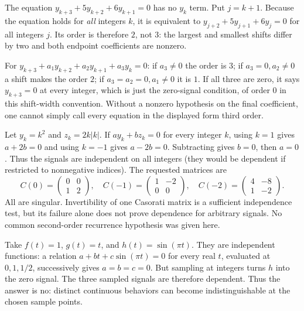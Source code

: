 The equation $y_{k+3}+5y_{k+2}+6y_{k+1}=0$ has no $y_k$ term.
Put $j=k+1$. Because the equation holds for \emph{all} integers $k$, it
is equivalent to $y_{j+2}+5y_{j+1}+6y_j=0$ for all integers $j$.
Its order is therefore $2$, not $3$: the largest and smallest shifts differ
by two and both endpoint coefficients are nonzero.

For $y_{k+3}+a_1y_{k+2}+a_2y_{k+1}+a_3y_k=0$:
if $a_3\ne0$ the order is $3$; if $a_3=0,a_2\ne0$ a shift makes the
order $2$; if $a_3=a_2=0,a_1\ne0$ it is $1$.
If all three are zero, it says $y_{k+3}=0$ at every integer, which is
just the zero-signal condition, of order $0$ in this shift-width convention.
Without a nonzero hypothesis on the final coefficient, one cannot simply
call every equation in the displayed form third order.

Let $y_k=k^2$ and $z_k=2k|k|$. If $ay_k+bz_k=0$ for every integer $k$,
using $k=1$ gives $a+2b=0$ and using $k=-1$ gives $a-2b=0$.
Subtracting gives $b=0$, then $a=0$. Thus the signals are independent on
all integers (they would be dependent if restricted to nonnegative indices).
The requested matrices are
\[
 C(0)=\begin{pmatrix}0&0\\1&2\end{pmatrix},\quad
 C(-1)=\begin{pmatrix}1&-2\\0&0\end{pmatrix},\quad
 C(-2)=\begin{pmatrix}4&-8\\1&-2\end{pmatrix}.
\]
All are singular. Invertibility of one Casorati matrix is a sufficient
independence test, but its failure alone does not prove dependence for
arbitrary signals. No common second-order recurrence hypothesis was given here.

Take $f(t)=1$, $g(t)=t$, and $h(t)=\sin(\pi t)$.
They are independent functions: a relation $a+bt+c\sin(\pi t)=0$
for every real $t$, evaluated at $0,1,1/2$, successively gives $a=b=c=0$.
But sampling at integers turns $h$ into the zero signal. The three sampled
signals are therefore dependent. Thus the answer is no: distinct continuous
behaviors can become indistinguishable at the chosen sample points.


